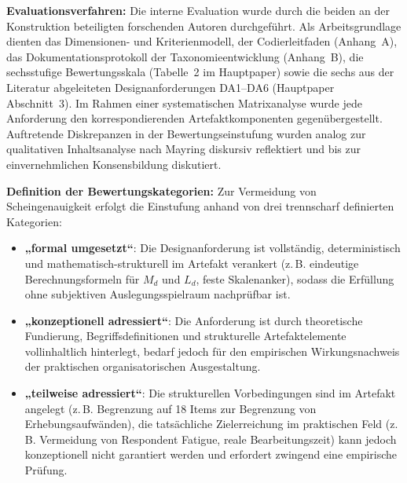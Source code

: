 \documentclass[10pt,a4paper]{article}
\begin{document}
\textbf{Evaluationsverfahren:} Die interne Evaluation wurde durch die beiden an der Konstruktion beteiligten forschenden Autoren durchgeführt. Als Arbeitsgrundlage dienten das Dimensionen- und Kriterienmodell, der Codierleitfaden (Anhang~A), das Dokumentationsprotokoll der Taxonomieentwicklung (Anhang~B), die sechsstufige Bewertungsskala (Tabelle~2 im Hauptpaper) sowie die sechs aus der Literatur abgeleiteten Designanforderungen DA1–DA6 (Hauptpaper Abschnitt~3). Im Rahmen einer systematischen Matrixanalyse wurde jede Anforderung den korrespondierenden Artefaktkomponenten gegenübergestellt. Auftretende Diskrepanzen in der Bewertungseinstufung wurden analog zur qualitativen Inhaltsanalyse nach Mayring \cite{Ma14} diskursiv reflektiert und bis zur einvernehmlichen Konsensbildung diskutiert.

\textbf{Definition der Bewertungskategorien:} Zur Vermeidung von Scheingenauigkeit erfolgt die Einstufung anhand von drei trennscharf definierten Kategorien:
\begin{itemize}[leftmargin=1.8em,itemsep=0.08em]
  \item \textbf{„formal umgesetzt“}: Die Designanforderung ist vollständig, deterministisch und mathematisch-strukturell im Artefakt verankert (z.\,B. eindeutige Berechnungsformeln für $M_d$ und $L_d$, feste Skalenanker), sodass die Erfüllung ohne subjektiven Auslegungsspielraum nachprüfbar ist.
  \item \textbf{„konzeptionell adressiert“}: Die Anforderung ist durch theoretische Fundierung, Begriffsdefinitionen und strukturelle Artefaktelemente vollinhaltlich hinterlegt, bedarf jedoch für den empirischen Wirkungsnachweis der praktischen organisatorischen Ausgestaltung.
  \item \textbf{„teilweise adressiert“}: Die strukturellen Vorbedingungen sind im Artefakt angelegt (z.\,B. Begrenzung auf 18 Items zur Begrenzung von Erhebungsaufwänden), die tatsächliche Zielerreichung im praktischen Feld (z.\,B. Vermeidung von Respondent Fatigue, reale Bearbeitungszeit) kann jedoch konzeptionell nicht garantiert werden und erfordert zwingend eine empirische Prüfung.
\end{itemize}
\end{document}
